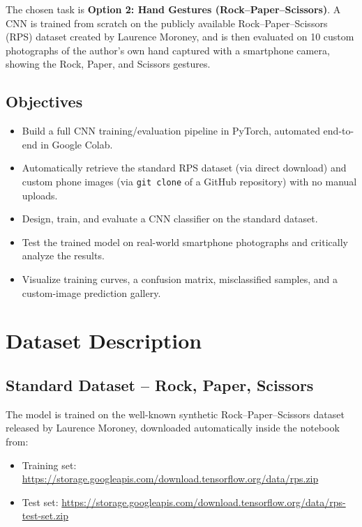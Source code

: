 \documentclass[11pt,a4paper]{article}
\begin{document}
The chosen task is \textbf{Option 2: Hand Gestures (Rock--Paper--Scissors)}. A CNN is trained from scratch on the publicly available Rock--Paper--Scissors (RPS) dataset created by Laurence Moroney, and is then evaluated on 10 custom photographs of the author's own hand captured with a smartphone camera, showing the Rock, Paper, and Scissors gestures.

\subsection{Objectives}
\begin{itemize}[leftmargin=1.3cm]
    \item Build a full CNN training/evaluation pipeline in PyTorch, automated end-to-end in Google Colab.
    \item Automatically retrieve the standard RPS dataset (via direct download) and custom phone images (via \texttt{git clone} of a GitHub repository) with no manual uploads.
    \item Design, train, and evaluate a CNN classifier on the standard dataset.
    \item Test the trained model on real-world smartphone photographs and critically analyze the results.
    \item Visualize training curves, a confusion matrix, misclassified samples, and a custom-image prediction gallery.
\end{itemize}

\section{Dataset Description}

\subsection{Standard Dataset -- Rock, Paper, Scissors}
The model is trained on the well-known synthetic Rock--Paper--Scissors dataset released by Laurence Moroney, downloaded automatically inside the notebook from:
\begin{itemize}[leftmargin=1.3cm]
    \item Training set: \url{https://storage.googleapis.com/download.tensorflow.org/data/rps.zip}
    \item Test set: \url{https://storage.googleapis.com/download.tensorflow.org/data/rps-test-set.zip}
\end{itemize}
\end{document}
